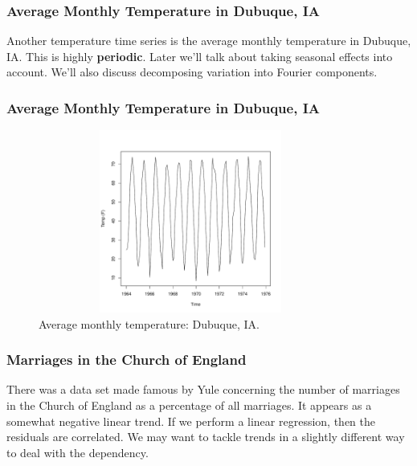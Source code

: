 \documentclass[%
xcolor=pdftex]{beamer}
\begin{document}
\begin{frame}
\frametitle{Average Monthly Temperature in Dubuque, IA}

Another temperature time series is the average monthly temperature in Dubuque, IA. This is highly \textbf{periodic}. Later we'll talk about taking seasonal effects into account. We'll also discuss decomposing variation into Fourier components.
\end{frame}

\begin{frame}
\frametitle{Average Monthly Temperature in Dubuque, IA}

\begin{figure} \caption{Average monthly temperature: Dubuque, IA.}
\begin{center}
\includegraphics[width=100mm, height=60mm]{pics/dubuque.pdf}
\end{center}
\end{figure}

\end{frame}

\begin{frame}
\frametitle{Marriages in the Church of England}

There was a data set made famous by Yule concerning the number of marriages in the Church of England as a percentage of all marriages.  It appears as a somewhat negative linear trend. If we perform a linear regression, then the residuals are correlated.  We may want to tackle trends in a slightly different way to deal with the dependency.

\end{frame}
\end{document}

